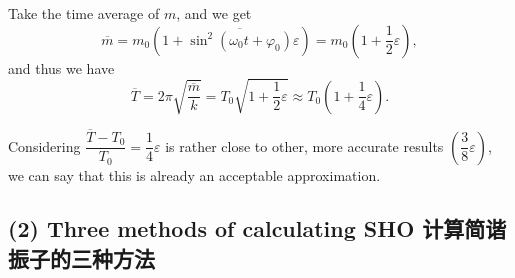 Take the time average of \(m\), and we get
\[\overline{m} = m_0 \left(1 + \overline{\sin^2 (\omega_0 t + \varphi_0)} \varepsilon \right) = m_0 \left(1 + \dfrac{1}{2} \varepsilon \right),\]
and thus we have
\[\overline{T} = 2 \pi \sqrt{\dfrac{\overline{m}}{k}} = T_0 \sqrt{1 + \dfrac{1}{2} \varepsilon} \approx T_0 \left( 1 + \dfrac{1}{4} \varepsilon \right).\]

Considering
\(\dfrac{\overline{T} - T_0}{T_0} = \dfrac{1}{4} \varepsilon\) is rather
close to other, more accurate results
\(\left( \dfrac{3}{8} \varepsilon \right)\), we can say that this is
already an acceptable approximation.

\subsection*{(2) Three methods of calculating SHO
计算简谐振子的三种方法}\label{three-methods-of-calculating-sho-ux8ba1ux7b97ux7b80ux8c10ux632fux5b50ux7684ux4e09ux79cdux65b9ux6cd5}

